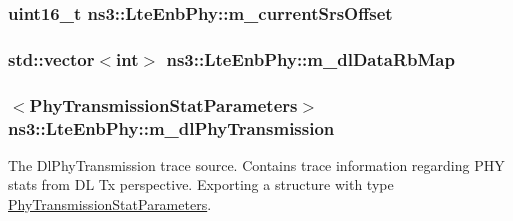 \subsubsection[{\texorpdfstring{m\+\_\+current\+Srs\+Offset}{m_currentSrsOffset}}]{\setlength{\rightskip}{0pt plus 5cm}uint16\+\_\+t ns3\+::\+Lte\+Enb\+Phy\+::m\+\_\+current\+Srs\+Offset\hspace{0.3cm}{\ttfamily [private]}}\hypertarget{classns3_1_1LteEnbPhy_a8356f950997d27723f4997ddb797e589}{}\label{classns3_1_1LteEnbPhy_a8356f950997d27723f4997ddb797e589}
\subsubsection[{\texorpdfstring{m\+\_\+dl\+Data\+Rb\+Map}{m_dlDataRbMap}}]{\setlength{\rightskip}{0pt plus 5cm}std\+::vector$<$int$>$ ns3\+::\+Lte\+Enb\+Phy\+::m\+\_\+dl\+Data\+Rb\+Map\hspace{0.3cm}{\ttfamily [private]}}\hypertarget{classns3_1_1LteEnbPhy_a3fb8cd42886925222a259b135fa0c5e4}{}\label{classns3_1_1LteEnbPhy_a3fb8cd42886925222a259b135fa0c5e4}
\subsubsection[{\texorpdfstring{m\+\_\+dl\+Phy\+Transmission}{m_dlPhyTransmission}}]{$<${\bf Phy\+Transmission\+Stat\+Parameters}$>$ ns3\+::\+Lte\+Enb\+Phy\+::m\+\_\+dl\+Phy\+Transmission\hspace{0.3cm}{\ttfamily [private]}}\hypertarget{classns3_1_1LteEnbPhy_af17fb1bef18925f674f062e996135955}{}\label{classns3_1_1LteEnbPhy_af17fb1bef18925f674f062e996135955}
The {\ttfamily Dl\+Phy\+Transmission} trace source. Contains trace information regarding P\+HY stats from DL Tx perspective. Exporting a structure with type \hyperlink{structns3_1_1PhyTransmissionStatParameters}{Phy\+Transmission\+Stat\+Parameters}. 
